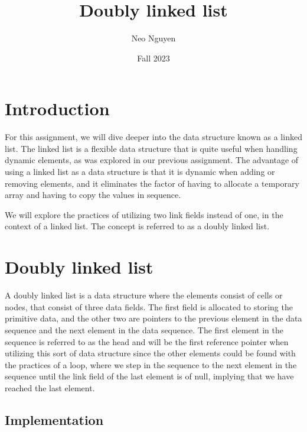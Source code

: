 \documentclass[a4paper,11pt]{article}
\begin{document}
\title{
    \textbf{Doubly linked list}
}
\author{Neo Nguyen}
\date{Fall 2023}

\maketitle

\section*{Introduction}

    For this assignment, we will dive deeper into the data structure known as a linked list. The linked list is a flexible data structure that is quite useful when handling dynamic elements, as was explored in our previous assignment. The advantage of using a linked list as a data structure is that it is dynamic when adding or removing elements, and it eliminates the factor of having to allocate a temporary array and having to copy the values in sequence.

    We will explore the practices of utilizing two link fields instead of one, in the context of a linked list. The concept is referred to as a doubly linked list.
    
\section*{Doubly linked list}

    A doubly linked list is a data structure where the elements consist of cells or nodes, that consist of three data fields. The first field is allocated to storing the primitive data, and the other two are pointers to the previous element in the data sequence and the next element in the data sequence. The first element in the sequence is referred to as the head and will be the first reference pointer when utilizing this sort of data structure since the other elements could be found with the practices of a loop, where we step in the sequence to the next element in the sequence until the link field of the last element is of null, implying that we have reached the last element.

    \subsection*{Implementation}
\end{document}
